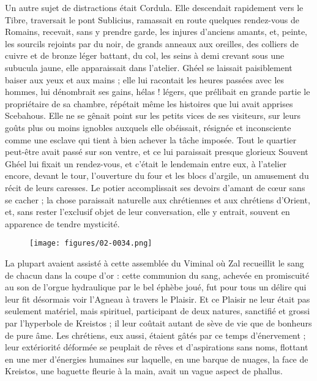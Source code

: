 \documentclass[a4paper, 11pt, oneside, polutonikogreek, french]{article}
\begin{document}
Un autre sujet de distractions était Cordula. Elle descendait rapidement vers le Tibre, traversait le pont Sublicius, ramassait en route quelques rendez-vous de Romains, recevait, sans y prendre garde, les injures d'anciens amants, et, peinte, les sourcils rejoints par du noir, de grands anneaux aux oreilles, des colliers de cuivre et de bronze léger battant, du col, les seins à demi crevant sous une subucula jaune, elle apparaissait dans l'atelier. Ghéel se laissait paisiblement baiser aux yeux et aux mains ; elle lui racontait les heures passées avec les hommes, lui dénombrait ses gains, hélas ! légers, que prélibait en grande partie le propriétaire de sa chambre, répétait même les histoires que lui avait apprises Scebahous. Elle ne se gênait point sur les petits vices de ses visiteurs, sur leurs goûts plus ou moins ignobles auxquels elle obéissait, résignée et inconsciente comme une esclave qui tient à bien achever la tâche imposée. Tout le quartier peut-être avait passé sur son ventre, et ce lui paraissait presque glorieux Souvent Ghéel lui fixait un rendez-vous, et c'était le lendemain entre eux, à l'atelier encore, devant le tour, l'ouverture du four et les blocs d'argile, un amusement du récit de leurs caresses. Le potier accomplissait ses devoirs d'amant de cœur sans se cacher ; la chose paraissait naturelle aux chrétiennes et aux chrétiens d'Orient, et, sans rester l'exclusif objet de leur conversation, elle y entrait, souvent en apparence de tendre mysticité.
\begin{figure}[H]
\centering
\texttt{[image: figures/02-0034.png]}
\end{figure}
La plupart avaient assisté à cette assemblée du Viminal où Zal recueillit le sang de chacun dans la coupe d'or : cette communion du sang, achevée en promiscuité au son de l'orgue hydraulique par le bel éphèbe joué, fut pour tous un délire qui leur fit désormais voir l'Agneau à travers le Plaisir. Et ce Plaisir ne leur était pas seulement matériel, mais spirituel, participant de deux natures, sanctifié et grossi par l'hyperbole de Kreistos ; il leur coûtait autant de sève de vie que de bonheurs de pure âme. Les chrétiens, eux aussi, étaient gâtés par ce temps d'énervement ; leur extériorité déformée se peuplait de rêves et d'aspirations sans noms, flottant en une mer d'énergies humaines sur laquelle, en une barque de nuages, la face de Kreistos, une baguette fleurie à la main, avait un vague aspect de phallus.
\end{document}
